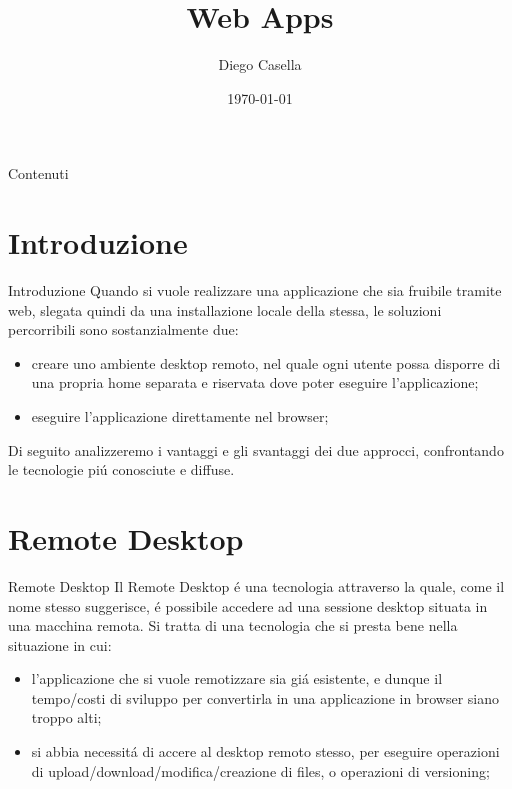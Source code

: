 \documentclass{beamer}
\title{Web Apps}
\author{Diego Casella}
\date{\today}
\begin{document}
\maketitle

\begin{frame}{Contenuti} %
\tableofcontents
\end{frame}

\section{Introduzione}
\begin{frame}{Introduzione}
Quando si vuole realizzare una applicazione che sia fruibile tramite web, slegata quindi da una installazione locale della stessa,
le soluzioni percorribili sono sostanzialmente due:
\begin{itemize}
\item creare uno ambiente desktop remoto, nel quale ogni utente possa disporre di una propria home separata e riservata dove poter eseguire l'applicazione;
\item eseguire l'applicazione direttamente nel browser;
\end{itemize}
Di seguito analizzeremo i vantaggi e gli svantaggi dei due approcci, confrontando le tecnologie pi\'u conosciute e diffuse.
\end{frame}

%
\section{Remote Desktop}
\begin{frame}{Remote Desktop}
Il Remote Desktop \'e una tecnologia attraverso la quale, come il nome stesso suggerisce, \'e possibile accedere ad una sessione
desktop situata in una macchina remota.
\newline
Si tratta di una tecnologia che si presta bene nella situazione in cui:
\begin{itemize}
\item l'applicazione che si vuole remotizzare sia gi\'a esistente, e dunque il tempo/costi di sviluppo per convertirla in una applicazione in browser siano troppo alti;
\item si abbia necessit\'a di accere al desktop remoto stesso, per eseguire operazioni di upload/download/modifica/creazione di
files, o operazioni di versioning;
\end{itemize}
\end{frame}
\end{document}
